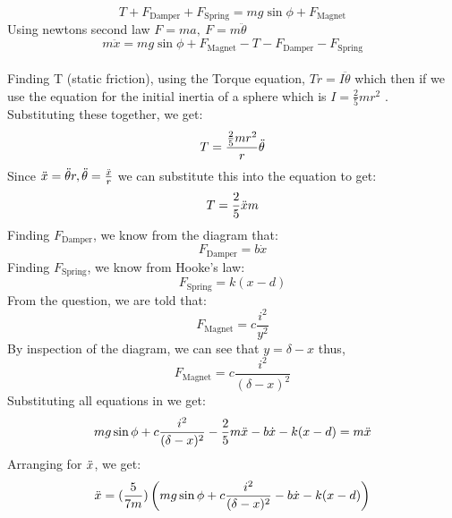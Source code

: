 \begin{equation}
    T + F_{\text{Damper}} + F_{\text{Spring}} = mg\sin{\phi} + F_{\text{Magnet}}
\end{equation}
Using newtons second law $F = ma,\  F = m\ddot{\theta} $
\\
\begin{equation}
    m\ddot{x} = mg\sin{\phi} + F_{\text{Magnet}} -T - F_{\text{Damper}} - F_{\text{Spring}}
\end{equation}
\\
Finding T (static friction), using the Torque equation, $Tr = I\ddot{\theta} $ which then if we use the equation for the initial inertia of a sphere which is $I = \frac{2}{5}mr^2$ . Substituting these together, we get:
\begin{equation}
    T = \frac{\frac{2}{5}mr^2}{r}\Ddot{\theta}
\end{equation}
Since $\Ddot{x} = \Ddot{\theta}r, \Ddot{\theta} = \frac{\Ddot{x}}{r}$ we can substitute this into the equation to get:
\begin{equation}
T = \frac{2}{5}\Ddot{x}m
\end{equation}
Finding $F_{\text{Damper}} $, we know from the diagram that:
\begin{equation}
    F_{\text{Damper}} = b\dot{x}
\end{equation}
Finding $F_{\text{Spring}} $, we know from Hooke's law:
\begin{equation}
   F_{\text{Spring}} =  k(x-d)
\end{equation}
From the question, we are told that:
\begin{equation}
    F_{\text{Magnet}} = c\frac{i^2}{y^2}
\end{equation}
By inspection of the diagram, we can see that $y = \delta - x $ thus,
\begin{equation}
    F_{\text{Magnet}} = c\frac{i^2}{(\delta - x)^2}
\end{equation}
Substituting all equations in we get:
\begin{equation}
     mg\sin{\phi} + c\frac{i^2}{(\delta - x)^2} -\frac{2}{5}m\Ddot{x} - b\dot{x} -k(x-d)  = m\Ddot{x} 
\end{equation}
Arranging for $\Ddot{x} $, we get: 
\\ 
\begin{equation}
\Ddot{x} = (\frac{5}{7m})  \left(mg\sin{\phi} + c\frac{i^2}{(\delta - x)^2} - b\dot{x} -k(x-d)  \right)
\end{equation}
\\
